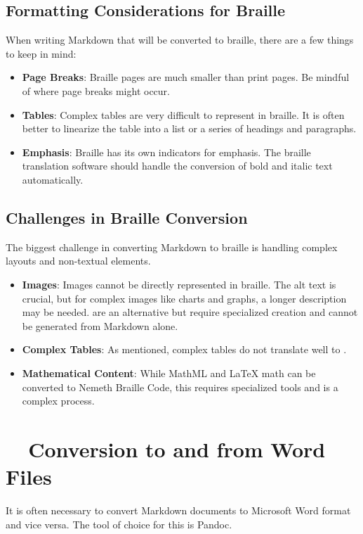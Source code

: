\subsection{Formatting Considerations for Braille}
\label{subsec:braille-formatting-considerations}
When writing Markdown that will be converted to braille, there are a few things to keep in mind:
\begin{itemize}
	\item \textbf{Page Breaks}: Braille pages are much smaller than print pages. Be mindful of where page breaks might occur.
	\item \textbf{Tables}: Complex tables are very difficult to represent in braille. It is often better to linearize the table into a list or a series of headings and paragraphs.
	\item \textbf{Emphasis}: Braille has its own indicators for emphasis. The braille translation software should handle the conversion of bold and italic text automatically.
\end{itemize}

\subsection{Challenges in Braille Conversion}
\label{subsec:braille-conversion-challenges}
The biggest challenge in converting Markdown to braille is handling complex layouts and non-textual elements.
\begin{itemize}
	\item \textbf{Images}: Images cannot be directly represented in braille. The alt text is crucial, but for complex images like charts and graphs, a longer description may be needed.  are an alternative but require specialized creation and cannot be generated from Markdown alone.
	\item \textbf{Complex Tables}: As mentioned, complex tables do not translate well to .
	\item \textbf{Mathematical Content}: While MathML and LaTeX math can be converted to Nemeth Braille Code, this requires specialized tools and is a complex process.
\end{itemize}

\section{~~Conversion to and from Word Files}
\label{sec:markdown-word-conversion}
It is often necessary to convert Markdown documents to Microsoft Word format and vice versa. The tool of choice for this is Pandoc.

